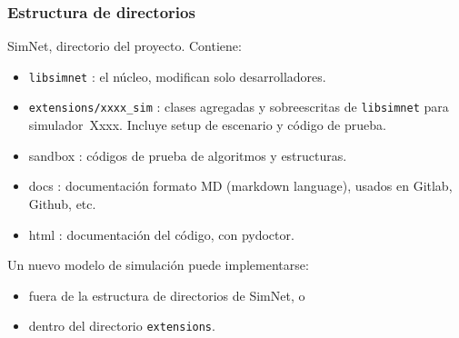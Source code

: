 \documentclass[spanish]{beamer}    %
\begin{document}
\begin{frame}
    \frametitle{Estructura de directorios}
    SimNet, directorio del proyecto. Contiene:
        \begin{itemize}
            \item \texttt{libsimnet} : el núcleo, modifican solo desarrolladores.
            \item \texttt{extensions/xxxx\_sim} : clases agregadas y sobreescritas de \texttt{libsimnet} para simulador\ Xxxx. Incluye setup de escenario y código de prueba.
            \item sandbox : códigos de prueba de algoritmos y estructuras.
            \item docs : documentación formato MD (markdown language), usados en Gitlab, Github, etc.
            \item html : documentación del código, con pydoctor. 
        \end{itemize}
    Un nuevo modelo de simulación puede implementarse:
        \begin{itemize}
            \item fuera de la estructura de directorios de SimNet, o
            \item dentro del directorio \texttt{extensions}.
        \end{itemize}
\end{frame}

\end{document}
